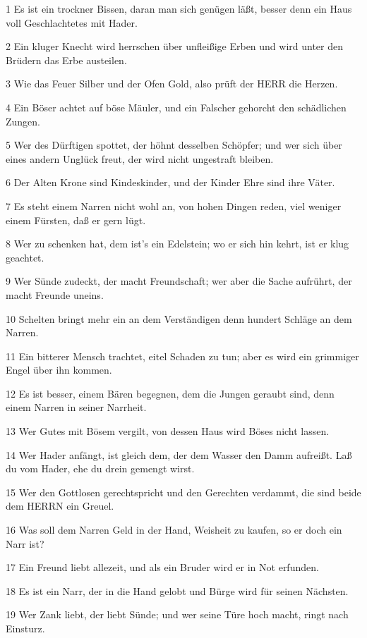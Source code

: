 \par 1 Es ist ein trockner Bissen, daran man sich genügen läßt, besser denn ein Haus voll Geschlachtetes mit Hader.
\par 2 Ein kluger Knecht wird herrschen über unfleißige Erben und wird unter den Brüdern das Erbe austeilen.
\par 3 Wie das Feuer Silber und der Ofen Gold, also prüft der HERR die Herzen.
\par 4 Ein Böser achtet auf böse Mäuler, und ein Falscher gehorcht den schädlichen Zungen.
\par 5 Wer des Dürftigen spottet, der höhnt desselben Schöpfer; und wer sich über eines andern Unglück freut, der wird nicht ungestraft bleiben.
\par 6 Der Alten Krone sind Kindeskinder, und der Kinder Ehre sind ihre Väter.
\par 7 Es steht einem Narren nicht wohl an, von hohen Dingen reden, viel weniger einem Fürsten, daß er gern lügt.
\par 8 Wer zu schenken hat, dem ist's ein Edelstein; wo er sich hin kehrt, ist er klug geachtet.
\par 9 Wer Sünde zudeckt, der macht Freundschaft; wer aber die Sache aufrührt, der macht Freunde uneins.
\par 10 Schelten bringt mehr ein an dem Verständigen denn hundert Schläge an dem Narren.
\par 11 Ein bitterer Mensch trachtet, eitel Schaden zu tun; aber es wird ein grimmiger Engel über ihn kommen.
\par 12 Es ist besser, einem Bären begegnen, dem die Jungen geraubt sind, denn einem Narren in seiner Narrheit.
\par 13 Wer Gutes mit Bösem vergilt, von dessen Haus wird Böses nicht lassen.
\par 14 Wer Hader anfängt, ist gleich dem, der dem Wasser den Damm aufreißt. Laß du vom Hader, ehe du drein gemengt wirst.
\par 15 Wer den Gottlosen gerechtspricht und den Gerechten verdammt, die sind beide dem HERRN ein Greuel.
\par 16 Was soll dem Narren Geld in der Hand, Weisheit zu kaufen, so er doch ein Narr ist?
\par 17 Ein Freund liebt allezeit, und als ein Bruder wird er in Not erfunden.
\par 18 Es ist ein Narr, der in die Hand gelobt und Bürge wird für seinen Nächsten.
\par 19 Wer Zank liebt, der liebt Sünde; und wer seine Türe hoch macht, ringt nach Einsturz.
